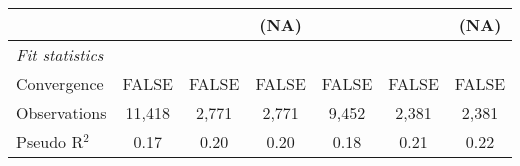 \begin{tabular}{lcccccc}
                                                                              &                        &                        & (NA)                   &                        &                        & (NA)\\   
   \midrule
   \emph{Fit statistics}\\
   Convergence                                                                &FALSE                   & FALSE                  & FALSE                  & FALSE                  & FALSE                  & FALSE\\  
   Observations                                                               & 11,418                 & 2,771                  & 2,771                  & 9,452                  & 2,381                  & 2,381\\  
   Pseudo R$^2$                                                               & 0.17                   & 0.20                   & 0.20                   & 0.18                   & 0.21                   & 0.22\\  
   

\end{tabular}
